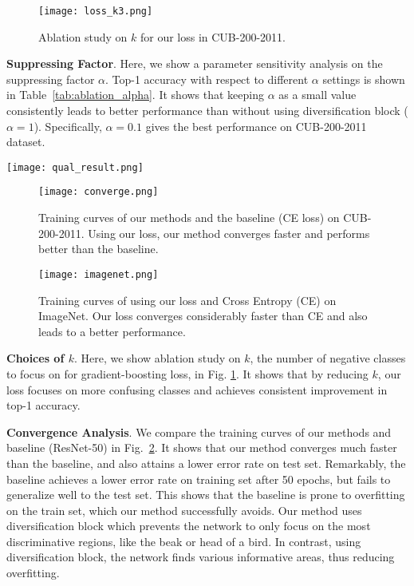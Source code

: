 \documentclass[letterpaper]{article} \usepackage{aaai20}  \usepackage{times}  \usepackage{helvet} \usepackage{courier}  \usepackage[hyphens]{url}  \usepackage{graphicx} \usepackage{multirow}
\begin{document}
\begin{figure}[t]
		\centering
		\texttt{[image: loss\_k3.png]}
	\caption{Ablation study on $k$ for our loss in CUB-200-2011.}
	\label{fig:loss_k}
\end{figure}

\textbf{Suppressing Factor}.
Here, we show a parameter sensitivity analysis on the suppressing factor $\alpha$. Top-1 accuracy with respect to different $\alpha$ settings is shown in Table~\ref{tab:ablation_alpha}. It shows that keeping $\alpha$ as a small value consistently leads to better performance than without using diversification block ($\alpha=1$). Specifically, $\alpha=0.1$ gives the best performance on CUB-200-2011 dataset.
\begin{figure*}[t]
\centering
\texttt{[image: qual\_result.png]}\\
\caption{Class activation map (CAM) comparison between our method and baseline in different datasets. \emph{Top} to \emph{below}: original image, CAM of the ground-truth class of baseline, CAM of the ground-truth class of our method. While baseline only focuses on the most discriminative region, our method accurately diversifies attentions to other informative regions of the objects. }
\label{Fig:qual_result}
\end{figure*}
\begin{figure}[htp]
\centering
\texttt{[image: converge.png]}\\
\caption{Training curves of our methods and the baseline (CE loss) on CUB-200-2011. Using our loss, our method converges faster and performs better than the baseline.}
	\label{fig:converge}
\end{figure}
\begin{figure}[t]
\centering
\texttt{[image: imagenet.png]}\\
	\caption{Training curves of using our loss and Cross Entropy (CE) on ImageNet. Our loss converges considerably faster than CE and also leads to a better performance. 
	}
	\label{fig:imagenet}
\end{figure}

\textbf{Choices of $k$}.
Here, we show ablation study on $k$, the number of negative classes to focus on for gradient-boosting loss, in Fig. \ref{fig:loss_k}. It shows that by reducing $k$, our loss focuses on more confusing classes and achieves consistent improvement in top-1 accuracy. 

\textbf{Convergence Analysis}.
We compare the training curves of our methods and baseline (ResNet-50) in Fig.~\ref{fig:converge}. It shows that our method converges much faster than the baseline, and also attains a lower error rate on test set. Remarkably, the baseline achieves a lower error rate on training set after 50 epochs, but fails to generalize well to the test set. This shows that the baseline is prone to overfitting on the train set, which our method successfully avoids. Our method uses diversification block which prevents the network to only focus on the most discriminative regions, like the beak or head of a bird. In contrast, using diversification block, the network finds various informative areas, thus reducing overfitting.
\end{document}
